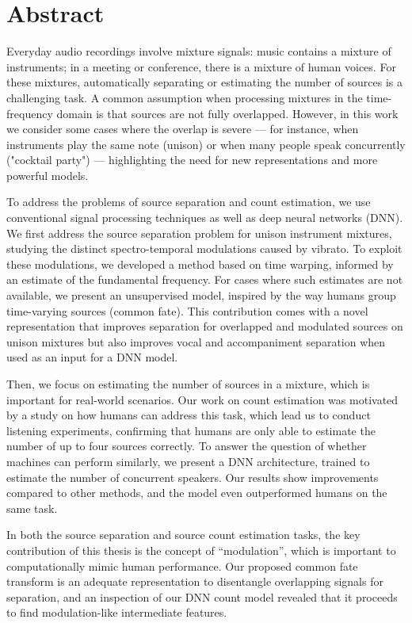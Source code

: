 \begingroup
\let\clearpage\relax
\let\cleardoublepage\relax
\let\cleardoublepage\relax

\chapter*{Abstract}
Everyday audio recordings involve mixture signals: music contains a mixture of instruments; in a meeting or conference, there is a mixture of human voices. 
For these mixtures, automatically separating or estimating the number of sources is a challenging task.
A common assumption when processing mixtures in the time-frequency domain is that sources are not fully overlapped.
However, in this work we consider some cases where the overlap is severe --- for instance, when instruments play the same note (unison) or when many people speak concurrently ("cocktail party") --- highlighting the need for new representations and more powerful models.
\par
To address the problems of source separation and count estimation, we use conventional signal processing techniques as well as deep neural networks (DNN).
We first address the source separation problem for unison instrument mixtures, studying the distinct spectro-temporal modulations caused by vibrato.
To exploit these modulations, we developed a method based on time warping, informed by an estimate of the fundamental frequency.
For cases where such estimates are not available, we present an unsupervised model, inspired by the way humans group time-varying sources (common fate).
This contribution comes with a novel representation that improves separation for overlapped and modulated sources on unison mixtures but also improves vocal and accompaniment separation when used as an input for a DNN model.
\par
Then, we focus on estimating the number of sources in a mixture, which is important for real-world scenarios.
Our work on count estimation was motivated by a study on how humans can address this task, which lead us to conduct listening experiments, confirming that humans are only able to estimate the number of up to four sources correctly.
To answer the question of whether machines can perform similarly, we present a DNN architecture, trained to estimate the number of concurrent speakers.
Our results show improvements compared to other methods, and the model even outperformed humans on the same task.
\par
In both the source separation and source count estimation tasks, the key contribution of this thesis is the concept of ``modulation'', which is important to computationally mimic human performance. 
Our proposed common fate transform is an adequate representation to disentangle overlapping signals for separation, and an inspection of our DNN count model revealed that it proceeds to find modulation-like intermediate features.
\vfill

